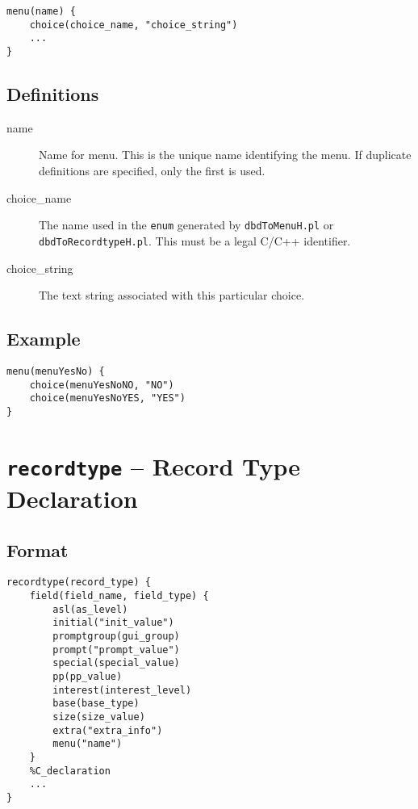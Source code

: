 \begin{verbatim}
menu(name) {
    choice(choice_name, "choice_string")
    ...
}
\end{verbatim}

\subsection{Definitions}

\begin{description}
\item [name] Name for menu. This is the unique name identifying the menu.
If duplicate definitions are specified, only the first is used.

\item [choice\_name] The name used in the \verb|enum| generated by \verb|dbdToMenuH.pl| or \verb|dbdToRecordtypeH.pl|.
This must be a legal C/C++ identifier.

\item [choice\_string] The text string associated with this particular choice.
\end{description}

\subsection{Example}

\begin{verbatim}
menu(menuYesNo) {
    choice(menuYesNoNO, "NO")
    choice(menuYesNoYES, "YES")
}
\end{verbatim}

\section{\texttt{recordtype} -- Record Type Declaration}

\subsection{Format}

\begin{verbatim}
recordtype(record_type) {
    field(field_name, field_type) {
        asl(as_level)
        initial("init_value")
        promptgroup(gui_group)
        prompt("prompt_value")
        special(special_value)
        pp(pp_value)
        interest(interest_level)
        base(base_type)
        size(size_value)
        extra("extra_info")
        menu("name")
    }
    %C_declaration
    ...
}
\end{verbatim}

